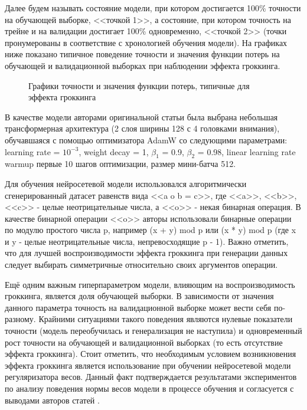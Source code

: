 \documentclass{article}
\begin{document}
\par Далее будем называть состояние модели, при котором достигается 100\% точности на обучающей выборке, <<точкой 1>>, а состояние, при котором точность на трейне и на валидации достигает 100\% одновременно, <<точкой 2>> (точки пронумерованы в соответствие с хронологией обучения модели). На графиках ниже показано типичное поведение точности и значения функции потерь на обучающей и валидационной выборках при наблюдении эффекта гроккинга.
\begin{figure}[h]
\centering
{}
\caption{Графики точности и значения функции потерь, типичные для эффекта гроккинга}
\label{fig:fig0}
\end{figure}
\par В качестве модели авторами оригинальной статьи \cite{grokking_start} была выбрана небольшая трансформерная архитектура (2 слоя ширины 128 с 4 головками внимания), обучавшаяся с помощью оптимизатора AdamW со следующими параметрами: learning rate =  $10^{-3}$, weight decay = 1, $\beta_1$ = 0.9, $\beta_2$ = 0.98, linear learning rate warmup первые 10 шагов оптимизации, размер мини-батча 512.
\par Для обучения нейросетевой модели использовался алгоритмически сгенерированный датасет равенств вида <<a o b = c>>, где <<a>>, <<b>>, <<c>> - целые неотрицательные числа, а <<o>> - некая бинарная операция. 
В качестве бинарной операции <<o>> авторы  использовали бинарные операции по модулю простого числа p, например (x + y) mod p или (x * y) mod p (где x и y - целые неотрицательные числа, непревосходящие p - 1). Важно отметить, что для лучшей воспроизводимости эффекта гроккинга при генерации данных следует выбирать симметричные относительно своих аргументов операции. 
\par Ещё одним важным гиперпараметром модели, влияющим на воспроизводимость гроккинга, является доля обучающей выборки. В зависимости от значения данного параметра точность на валидационной выборке может вести себя по-разному. Крайними ситуациями такого поведения являются нулевые показатели точности (модель переобучилась и генерализация не наступила) и одновременный рост точности на обучающей и валидационной выборках (то есть отсутствие эффекта гроккинга).
 Стоит отметить, что необходимым условием возникновения эффекта гроккинга является использование при обучении нейросетевой модели регуляризатора весов. Данный факт подтверждается результатами экспериментов по анализу поведения нормы весов модели в процессе обучения и согласуется с выводами авторов статей \cite{grokking_start, omnigrok}.
\end{document}
